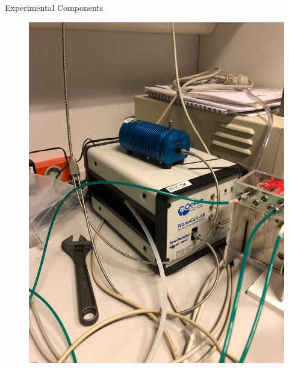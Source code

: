 \documentclass[10pt]{beamer}
\begin{document}
\begin{frame}{Experimental Components}
\begin{minipage}{0.5\textwidth}
\begin{figure}
\includegraphics[scale=0.04,angle=-90]{setup2.JPG}
\end{figure}
\end{minipage}
	
\end{frame}
\end{document}
